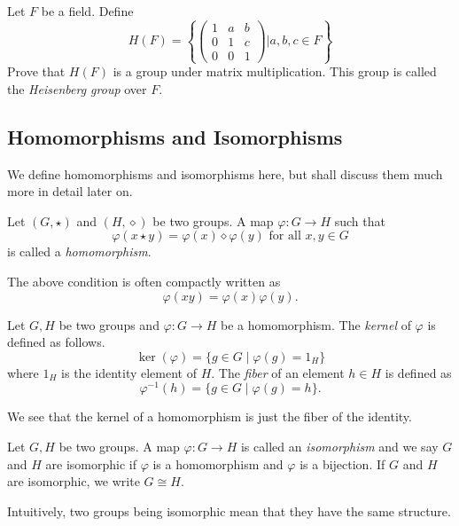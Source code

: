 \begin{exercise}
\label{defOfHeisenbergGrp}
    Let $F$ be a field. Define $$H(F)=\left\{\begin{pmatrix}1 & a & b \\ 0 & 1 & c \\ 0 & 0 & 1\end{pmatrix}\mathrel{\Bigg|} a,b,c\in F\right\}$$
    Prove that $H(F)$ is a group under matrix multiplication. This group is called the \textit{Heisenberg group} over $F$.
\end{exercise}

\subsection{Homomorphisms and Isomorphisms}
We define homomorphisms and isomorphisms here, but shall discuss them much more in detail later on.
\begin{definition}
\label{homomorphismDef}
Let $(G,\star)$ and $(H,\diamond)$ be two groups. A map $\varphi:G\to H$ such that
$$\varphi(x\star y)=\varphi(x)\diamond\varphi(y)\text{ for all $x,y\in G$}$$
is called a \textit{homomorphism}.
\end{definition}

The above condition is often compactly written as $$\varphi(xy)=\varphi(x)\varphi(y).$$

\begin{definition}
\label{defineFiberAndKer}
    Let $G,H$ be two groups and $\varphi:G\to H$ be a homomorphism. The \textit{kernel} of $\varphi$ is defined as follows.
    $$\operatorname{ker}(\varphi)=\{g\in G\mid \varphi(g)=1_H\}$$
    where $1_H$ is the identity element of $H$. The \textit{fiber} of an element $h\in H$ is defined as
    $$\varphi^{-1}(h)=\{g\in G\mid \varphi(g)=h\}.$$
\end{definition}

We see that the kernel of a homomorphism is just the fiber of the identity.

\begin{definition}
\label{isomorphismDef}
Let $G,H$ be two groups. A map $\varphi:G\to H$ is called an \textit{isomorphism} and we say $G$ and $H$ are isomorphic if $\varphi$ is a homomorphism and $\varphi$ is a bijection. If $G$ and $H$ are isomorphic, we write $G\cong H$.
\end{definition}

Intuitively, two groups being isomorphic mean that they have the same structure.

